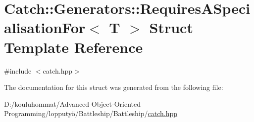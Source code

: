 \hypertarget{struct_catch_1_1_generators_1_1_requires_a_specialisation_for}{}\section{Catch\+:\+:Generators\+:\+:Requires\+A\+Specialisation\+For$<$ T $>$ Struct Template Reference}
\label{struct_catch_1_1_generators_1_1_requires_a_specialisation_for}


{\ttfamily \#include $<$catch.\+hpp$>$}



The documentation for this struct was generated from the following file\+:\begin{DoxyCompactItemize}
\item 
D\+:/kouluhommat/\+Advanced Object-\/\+Oriented Programming/lopputyö/\+Battleship/\+Battleship/\mbox{\hyperlink{catch_8hpp}{catch.\+hpp}}\end{DoxyCompactItemize}
